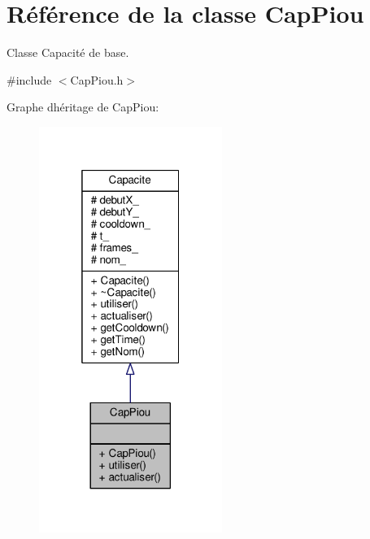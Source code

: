 \hypertarget{class_cap_piou}{}\section{Référence de la classe Cap\+Piou}
\label{class_cap_piou}


Classe Capacité de base.  




{\ttfamily \#include $<$Cap\+Piou.\+h$>$}



Graphe d\textquotesingle{}héritage de Cap\+Piou\+:\nopagebreak
\begin{figure}[H]
\begin{center}
\leavevmode
\includegraphics[width=169pt]{class_cap_piou__inherit__graph}
\end{center}
\end{figure}



